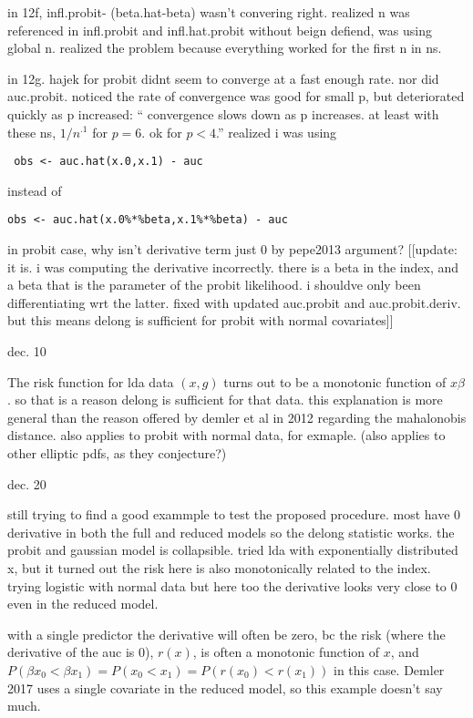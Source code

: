\documentclass{article}
\begin{document}
in 12f, infl.probit- (beta.hat-beta) wasn't convering right. realized
n was referenced in infl.probit and infl.hat.probit without beign
defiend, was using global n. realized the problem because everything
worked for the first n in ns.

in 12g. hajek for probit didnt seem to converge at a fast enough rate. nor did auc.probit. noticed the rate of convergence was good for small p, but deteriorated quickly as p increased: `` convergence slows down as
p increases. at least with these ns, $1/n^.1$ for $p=6$. ok for $p<4$.'' realized i was using
\begin{verbatim}
 obs <- auc.hat(x.0,x.1) - auc
\end{verbatim}
instead of         
\begin{verbatim}
obs <- auc.hat(x.0%*%beta,x.1%*%beta) - auc
\end{verbatim}

in probit case, why isn't derivative term just 0 by pepe2013 argument?
[[update: it is. i was computing the derivative incorrectly. there is a beta in the index, and a beta that is the parameter of the probit likelihood. i shouldve only been differentiating wrt the latter. fixed with updated auc.probit and auc.probit.deriv. but this means delong is sufficient for probit with normal covariates]]

dec. 10

The risk function for lda data $(x,g)$ turns out to be a monotonic function of $x\beta$. so that is a  reason delong is sufficient for that data. this explanation is more general than the reason offered by demler et al in 2012 regarding the mahalonobis distance. also applies to probit with normal data, for exmaple. (also applies to other elliptic pdfs, as they conjecture?)


dec. 20

still trying to find a good exammple to test the proposed
procedure. most have 0 derivative in both the full and reduced models
so the delong statistic works. the probit and gaussian model is
collapsible. tried lda with exponentially distributed x, but it turned
out the risk here is also monotonically related to the index. trying
logistic with normal data but here too the derivative looks very close
to 0 even in the reduced model.

with a single predictor the derivative will often be zero, bc the risk
(where the derivative of the auc is 0), $r(x)$, is often a monotonic
function of $x$, and
$P(\beta x_0 < \beta x_1) = P(x_0 < x_1) = P(r(x_0) < r(x_1))$ in this
case. Demler 2017 uses a single covariate in the reduced model, so
this example doesn't say much.
\end{document}
